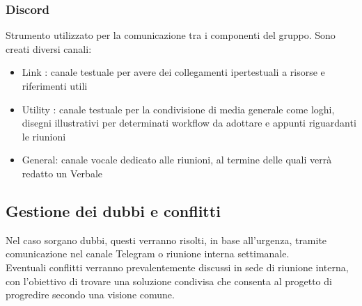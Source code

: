         \subsubsection{Discord}
        Strumento utilizzato per la comunicazione tra i componenti del gruppo. Sono creati diversi canali:
        \begin{itemize}
            \item Link : canale testuale per avere dei collegamenti ipertestuali a risorse e riferimenti utili
            \item Utility : canale testuale per la condivisione di media generale come loghi, disegni illustrativi per determinati workflow da adottare e appunti riguardanti le riunioni
            \item General: canale vocale dedicato alle riunioni, al termine delle quali verrà redatto un Verbale
        \end{itemize}

    \subsection{Gestione dei dubbi e conflitti}
        Nel caso sorgano dubbi, questi verranno risolti, in base all'urgenza, 
        tramite comunicazione nel canale Telegram o riunione interna 
        settimanale. \\
        Eventuali conflitti verranno prevalentemente discussi in sede di riunione 
        interna, con l'obiettivo di trovare una soluzione condivisa che consenta 
        al progetto di progredire secondo una visione comune.